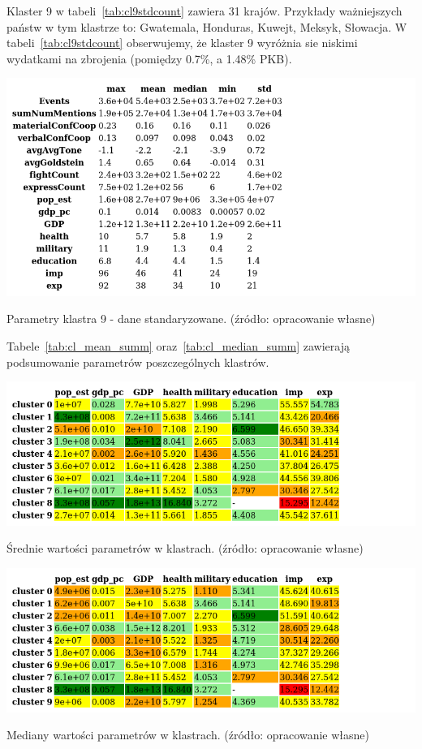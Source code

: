 \documentclass[11pt]{report}
\begin{document}
    Klaster 9 w tabeli~\ref{tab:cl9stdcount} zawiera 31 krajów.
    Przykłady ważniejszych państw w tym klastrze to: Gwatemala, Honduras, Kuwejt, Meksyk, Słowacja.
    W tabeli~\ref{tab:cl9stdcount} obserwujemy, że klaster 9 wyróżnia sie niskimi wydatkami na zbrojenia (pomiędzy 0.7\%, a 1.48\% PKB).

    \begin{table}[!htp]
        \centering
        \includegraphics[width=\linewidth]{tables/CLUST/desc/clust9std_desc.png}
        \caption{Parametry klastra 9 - dane standaryzowane. (źródło: opracowanie własne)}
        \label{tab:cl9std_desc}
    \end{table}

    Tabele~\ref{tab:cl_mean_summ} oraz~\ref{tab:cl_median_summ} zawierają podsumowanie parametrów poszczególnych klastrów.

    \begin{table}[!htp]
        \centering
        \includegraphics[width=\linewidth]{tables/CLUST/desc/cluster_mean_summary.png}
        \caption{Średnie wartości parametrów w klastrach. (źródło: opracowanie własne)}
        \label{tab:cl_mean_summ}
    \end{table}

    \begin{table}[!htp]
        \centering
        \includegraphics[width=\linewidth]{tables/CLUST/desc/cluster_median_summary.png}
        \caption{Mediany wartości parametrów w klastrach. (źródło: opracowanie własne)}
        \label{tab:cl_median_summ}
    \end{table}
\end{document}
